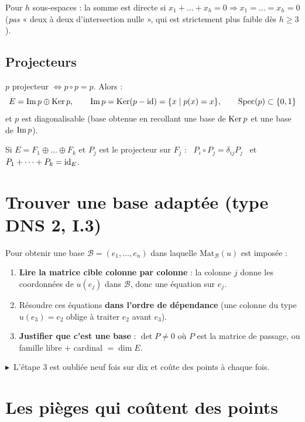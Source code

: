 \documentclass[10pt]{article}
\newcommand{\piege}{$\blacktriangleright$\ }
\begin{document}
Pour $h$ sous-espaces : la somme est directe si
$x_1+\dots+x_h=0 \Rightarrow x_1=\dots=x_h=0$ (\emph{pas} « deux à deux d'intersection nulle »,
qui est strictement plus faible dès $h\geq3$).

\subsection{Projecteurs}

$p$ projecteur $\iff p\circ p=p$. Alors :
\[E=\operatorname{Im} p\oplus\operatorname{Ker} p,\qquad \operatorname{Im} p=\operatorname{Ker}(p-\operatorname{id})=\{x\mid p(x)=x\},\qquad \operatorname{Spec}(p)\subset\{0,1\}\]
et $p$ est diagonalisable (base obtenue en recollant une base de $\operatorname{Ker} p$ et une base de $\operatorname{Im} p$).

Si $E=F_1\oplus\dots\oplus F_k$ et $P_j$ est le projecteur sur $F_j$ :
\ $P_i\circ P_j=\delta_{ij}P_j$ \ et \ $P_1+\dots+P_k=\operatorname{id}_E$.

\section{Trouver une base adaptée \textnormal{(type DNS 2, I.3)}}

Pour obtenir une base $\mathcal B=(e_1,\dots,e_n)$ dans laquelle $\mathrm{Mat}_{\mathcal B}(u)$ est imposée :
\begin{enumerate}
\item \textbf{Lire la matrice cible colonne par colonne} : la colonne $j$ donne les coordonnées de
$u(e_j)$ dans $\mathcal B$, donc une équation sur $e_j$.
\item Résoudre ces équations \textbf{dans l'ordre de dépendance} (une colonne du type $u(e_3)=e_2$
oblige à traiter $e_2$ avant $e_3$).
\item \textbf{Justifier que c'est une base} : $\det P\neq0$ où $P$ est la matrice de passage,
ou famille libre $+$ cardinal $=\dim E$.
\end{enumerate}

\piege L'étape 3 est oubliée neuf fois sur dix et coûte des points à chaque fois.

\section{Les pièges qui coûtent des points}
\end{document}

